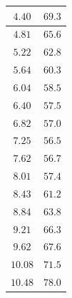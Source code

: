 \documentclass[a4paper, 12pt]{article}
\begin{document}
\begin{table}[!ht]
\begin{tabular}{|c|c|}
        $4.40$ & $69.3$\\ \hline
        $4.81$ & $65.6$\\ \hline
        $5.22$ & $62.8$\\ \hline
        $5.64$ & $60.3$\\ \hline
        $6.04$ & $58.5$\\ \hline
        $6.40$ & $57.5$\\ \hline
        $6.82$ & $57.0$\\ \hline
        $7.25$ & $56.5$\\ \hline
        $7.62$ & $56.7$\\ \hline
        $8.01$ & $57.4$\\ \hline
        $8.43$ & $61.2$\\ \hline
        $8.84$ & $63.8$\\ \hline
        $9.21$ & $66.3$\\ \hline
        $9.62$ & $67.6$\\ \hline
        $10.08$ & $71.5$\\ \hline
        $10.48$ & $78.0$\\ \hline

    \end{tabular}
    \quad
    \begin{tabular}{|c|c|}
        \hline


\end{tabular}
\end{table}
\end{document}

